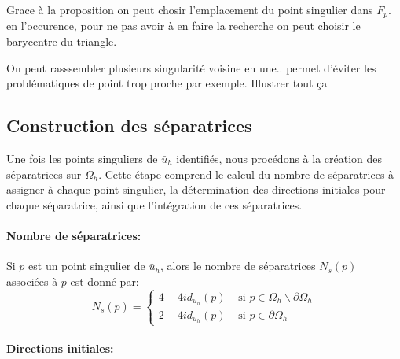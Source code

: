 \begin{remark}
    Grace à la proposition on peut chosir l'emplacement du point singulier dans $F_p$. en l'occurence, pour ne pas avoir à en faire la recherche on peut choisir le barycentre du triangle.\\
\end{remark}

On peut rasssembler plusieurs singularité voisine en une.. permet d'éviter les problématiques de point trop proche par exemple.
Illustrer tout ça 

\subsection{Construction des séparatrices}

Une fois les points singuliers de $\bar{u}_h$ identifiés, nous procédons à la création des séparatrices sur $\Omega_h$. Cette étape comprend le calcul du nombre de séparatrices à assigner à chaque point singulier, la détermination des directions initiales pour chaque séparatrice, ainsi que l'intégration de ces séparatrices.

\paragraph{Nombre de séparatrices:} Si $p$ est un point singulier de $\bar{u}_h$, alors le nombre de séparatrices $N_s(p)$ associées à $p$ est donné par:
\begin{equation}
    N_s(p) = 
    \left\{
    \begin{array}{ll}
    4-4id_{\bar{u}_h}(p) & \mbox{ si } p\in\Omega_h\backslash\partial\Omega_h\\[0.3cm]
    2-4id_{\bar{u}_h}(p) & \mbox{ si } p\in\partial\Omega_h
    \end{array}
    \right.
\end{equation}

\paragraph{Directions initiales:}

